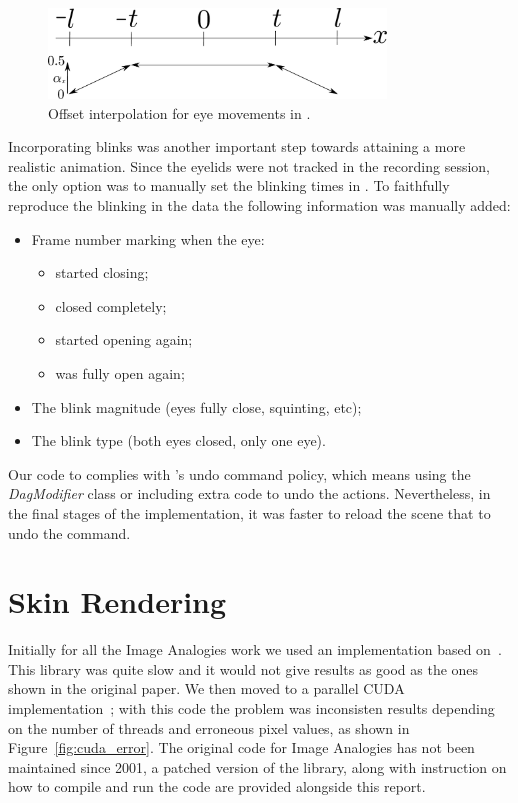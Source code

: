 \begin{figure}[htbp!]
\centering
\includegraphics[width=0.8\textwidth]{img/eyes_interpolation}
	\caption{Offset interpolation for eye movements in \Maya.}
	\label{fig:eyes_interpolation}
\end{figure}

Incorporating blinks was another important step towards attaining a more realistic animation.
Since the eyelids were not tracked in the recording session, the only option was to manually set the blinking times in \Maya.
To faithfully reproduce the blinking in the data the following information was manually added:
\begin{itemize}
\item Frame number marking when the eye:
	\begin{itemize}
	\item started closing;
	\item closed completely;
	\item started opening again;
	\item was fully open again;
	\end{itemize}
\item The blink magnitude (eyes fully close, squinting, etc);
\item The blink type (both eyes closed, only one eye).
\end{itemize}

Our code to complies with \Maya's undo command policy, which means using the \emph{DagModifier} class or including extra code to undo the actions.
Nevertheless, in the final stages of the implementation, it was faster to reload the scene that to undo the command.

\section{Skin Rendering}

Initially for all the Image Analogies work we used an implementation based on~\cite{ImAnSingleThreadWeb}.
This library was quite slow and it would not give results as good as the ones shown in the original paper.
We then moved to a parallel CUDA implementation~\cite{ImAnCudaWeb}; with this code the problem was inconsisten results depending on the number of threads and erroneous pixel values, as shown in Figure~\ref{fig:cuda_error}.
The original code for Image Analogies has not been maintained since 2001, a patched version of the library, along with instruction on how to compile and run the code are provided alongside this report.

